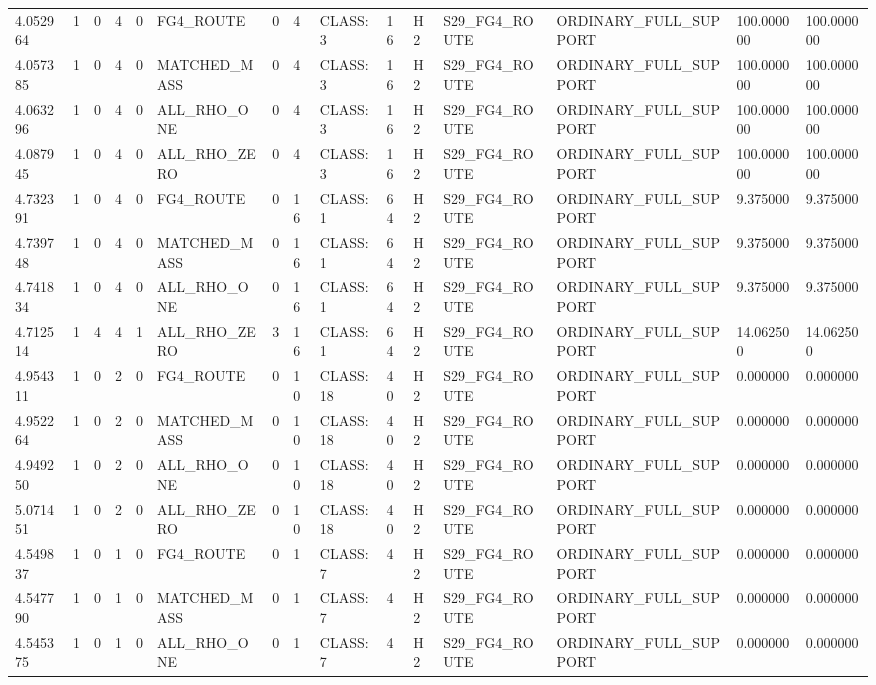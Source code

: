 \begin{tabular}{lllllllllllllll}
4.052964 & 1 & 0 & 4 & 0 & FG4\_ROUTE & 0 & 4 & CLASS:3 & 16 & H2 & S29\_FG4\_ROUTE & ORDINARY\_FULL\_SUPPORT & 100.000000 & 100.000000 \\
4.057385 & 1 & 0 & 4 & 0 & MATCHED\_MASS & 0 & 4 & CLASS:3 & 16 & H2 & S29\_FG4\_ROUTE & ORDINARY\_FULL\_SUPPORT & 100.000000 & 100.000000 \\
4.063296 & 1 & 0 & 4 & 0 & ALL\_RHO\_ONE & 0 & 4 & CLASS:3 & 16 & H2 & S29\_FG4\_ROUTE & ORDINARY\_FULL\_SUPPORT & 100.000000 & 100.000000 \\
4.087945 & 1 & 0 & 4 & 0 & ALL\_RHO\_ZERO & 0 & 4 & CLASS:3 & 16 & H2 & S29\_FG4\_ROUTE & ORDINARY\_FULL\_SUPPORT & 100.000000 & 100.000000 \\
4.732391 & 1 & 0 & 4 & 0 & FG4\_ROUTE & 0 & 16 & CLASS:1 & 64 & H2 & S29\_FG4\_ROUTE & ORDINARY\_FULL\_SUPPORT & 9.375000 & 9.375000 \\
4.739748 & 1 & 0 & 4 & 0 & MATCHED\_MASS & 0 & 16 & CLASS:1 & 64 & H2 & S29\_FG4\_ROUTE & ORDINARY\_FULL\_SUPPORT & 9.375000 & 9.375000 \\
4.741834 & 1 & 0 & 4 & 0 & ALL\_RHO\_ONE & 0 & 16 & CLASS:1 & 64 & H2 & S29\_FG4\_ROUTE & ORDINARY\_FULL\_SUPPORT & 9.375000 & 9.375000 \\
4.712514 & 1 & 4 & 4 & 1 & ALL\_RHO\_ZERO & 3 & 16 & CLASS:1 & 64 & H2 & S29\_FG4\_ROUTE & ORDINARY\_FULL\_SUPPORT & 14.062500 & 14.062500 \\
4.954311 & 1 & 0 & 2 & 0 & FG4\_ROUTE & 0 & 10 & CLASS:18 & 40 & H2 & S29\_FG4\_ROUTE & ORDINARY\_FULL\_SUPPORT & 0.000000 & 0.000000 \\
4.952264 & 1 & 0 & 2 & 0 & MATCHED\_MASS & 0 & 10 & CLASS:18 & 40 & H2 & S29\_FG4\_ROUTE & ORDINARY\_FULL\_SUPPORT & 0.000000 & 0.000000 \\
4.949250 & 1 & 0 & 2 & 0 & ALL\_RHO\_ONE & 0 & 10 & CLASS:18 & 40 & H2 & S29\_FG4\_ROUTE & ORDINARY\_FULL\_SUPPORT & 0.000000 & 0.000000 \\
5.071451 & 1 & 0 & 2 & 0 & ALL\_RHO\_ZERO & 0 & 10 & CLASS:18 & 40 & H2 & S29\_FG4\_ROUTE & ORDINARY\_FULL\_SUPPORT & 0.000000 & 0.000000 \\
4.549837 & 1 & 0 & 1 & 0 & FG4\_ROUTE & 0 & 1 & CLASS:7 & 4 & H2 & S29\_FG4\_ROUTE & ORDINARY\_FULL\_SUPPORT & 0.000000 & 0.000000 \\
4.547790 & 1 & 0 & 1 & 0 & MATCHED\_MASS & 0 & 1 & CLASS:7 & 4 & H2 & S29\_FG4\_ROUTE & ORDINARY\_FULL\_SUPPORT & 0.000000 & 0.000000 \\
4.545375 & 1 & 0 & 1 & 0 & ALL\_RHO\_ONE & 0 & 1 & CLASS:7 & 4 & H2 & S29\_FG4\_ROUTE & ORDINARY\_FULL\_SUPPORT & 0.000000 & 0.000000 \\

\end{tabular}
